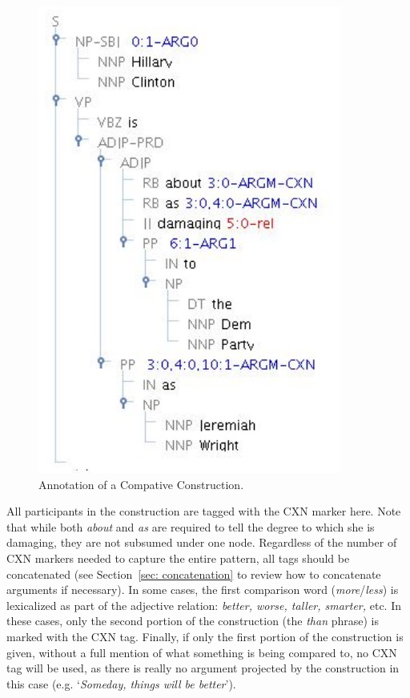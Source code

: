\documentclass[11pt]{report}
\begin{document}
\begin{figure}[htbp]
\centering
\includegraphics[scale=0.6]{img/asDamaging.jpg}
\caption{Annotation of a Compative Construction.}
\label{fig: ComparativeConstruction}
\end{figure}

All participants in the construction are tagged with the CXN marker here. Note that while both \textit{about} and \textit{as} are required to tell the degree to which she is damaging, they are not subsumed under one node. Regardless of the number of CXN markers needed to capture the entire pattern, all tags should be concatenated (see Section~\ref{sec: concatenation} to review how to concatenate arguments if necessary).  In some cases, the first comparison word (\textit{more}/\textit{less}) is lexicalized as part of the adjective relation: \textit{better, worse, taller, smarter,} etc.  In these cases, only the second portion of the construction (the \textit{than} phrase) is marked with the CXN tag.  Finally, if only the first portion of the construction is given, without a full mention of what something is being compared to, no CXN tag will be used, as there is really no argument projected by the construction in this case (e.g. `\textit{Someday, things will be better}').  
\end{document}
